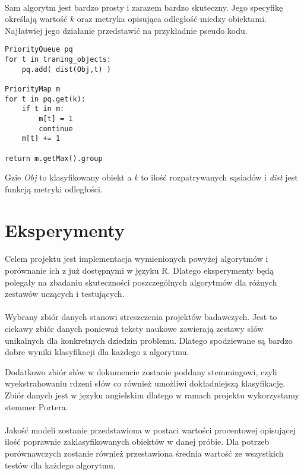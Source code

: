 \documentclass[a4paper,12pt]{article}
\begin{document}
\paragraph{} Sam algorytm jest bardzo prosty i zarazem bardzo skuteczny. Jego
specyfikę określają wartość $k$ oraz metryka opisująca odległość miedzy
obiektami. Najłatwiej jego działanie przedstawić na przykładnie pseudo kodu.

\begin{verbatim}
PriorityQueue pq
for t in traning_objects:
    pq.add( dist(Obj,t) )

PriorityMap m
for t in pq.get(k):
    if t in m:
        m[t] = 1
        continue
    m[t] += 1 

return m.getMax().group
\end{verbatim}

Gzie \textit{Obj} to klasyfikowany obiekt a \textit{k} to ilość
rozpatrywanych sąsiadów i \textit{dist} jest funkcją metryki odległości.

\section{Eksperymenty}
\paragraph{}
Celem projektu jest implementacja wymienionych powyżej algorytmów i porównanie ich z już dostępnymi w języku R. Dlatego eksperymenty będą polegały na zbadaniu skuteczności poszczególnych algorytmów dla różnych zestawów uczących i testujących. 


\paragraph{}
Wybrany zbiór danych stanowi streszczenia projektów badawczych. Jest to
ciekawy zbiór danych ponieważ teksty naukowe zawierają zestawy słów
unikalnych dla konkretnych dziedzin problemu. Dlatego spodziewane są bardzo
dobre wyniki klasyfikacji dla każdego z algorytmu. 

Dodatkowo zbiór słów w dokumencie zostanie poddany stemmingowi, czyli
wyekstrahowaniu rdzeni słów co również umożliwi dokładniejszą klasyfikację.
Zbiór danych jest w języku angielskim dlatego w ramach projektu wykorzystamy
stemmer Portera.  


\paragraph{}
Jakość modeli zostanie przedstawiona w postaci wartości procentowej
opisującej ilość poprawnie zaklasyfikowanych obiektów w danej próbie. Dla
potrzeb porównawczych zostanie również przestawiona średnia wartość ze
wszystkich testów dla każdego algorytmu. 
\end{document}
